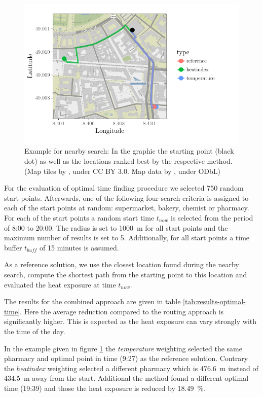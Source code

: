 \begin{figure}
	\centering
	\includegraphics[scale=1]{figures/optimaltime_route_example}
	\caption{Example for nearby search: In the graphic the starting point (black dot) as well as the locations ranked best by the respective method. (Map tiles by \textcite{Stamen2017}, under CC BY 3.0. Map data by \textcite{OSMF2016}, under ODbL)}
	\label{fig:optimaltime-route-example}
\end{figure}

For the evaluation of optimal time finding procedure we selected 750 random start points. Afterwards, one of the following four search criteria is assigned to each of the start points at random: supermarket, bakery, chemist or pharmacy. For each of the start points a random start time $t_{now}$ is selected from the period of 8:00 to 20:00. The radius is set to \SI{1000}{\meter} for all start points and the maximum number of results is set to 5. Additionally, for all start points a time buffer $t_{buff}$ of 15 minutes is assumed. 

As a reference solution, we use the closest location found during the nearby search, compute the shortest path from the starting point to this location and evaluated the heat exposure at time $t_{now}$. 

The results for the combined approach are given in table \ref{tab:results-optimal-time}. Here the average reduction compared to the routing approach is significantly higher. This is expected as the heat exposure can vary strongly with the time of the day. 

In the example given in figure \ref{fig:optimaltime-route-example} the \emph{temperature} weighting selected the same pharmacy and optimal point in time (9:27) as the reference solution. Contrary the \emph{heatindex} weighting selected a different pharmacy which is \SI{476.6}{\meter} instead of  \SI{434.5}{\meter} away from the start. Additional the method found a different optimal time (19:39) and those the heat exposure is reduced by \SI{18.49}{\percent}.  
 
